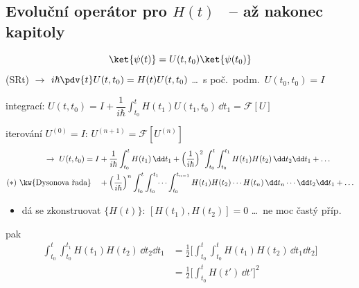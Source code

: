 \subsection{Evoluční operátor pro $H(t)$ \ {\normalfont\small -- až nakonec kapitoly}}
\[
  \ket{\psi(t)} = U(t,t_0)\ket{\psi(t_0)}
\]
(SRt) $\to$ \quad $i\hbar\pdv{t}U(t,t_0) = H(t)U(t,t_0)$ \quad \dots\ s poč.\ podm.\ $U(t_0,t_0) = I$

integrací: \quad $U(t,t_0) = I + \dfrac{1}{i\hbar}\displaystyle\int_{t_0}^{t}H(t_1)U(t_1,t_0)\,\dd t_1 = \mathcal{F}[U]$

\quad iterování \quad $U^{(0)} = I$: \quad $U^{(n+1)} = \mathcal{F}[U^{(n)}]$
\begin{align*}
  \to\ U(t,t_0) = I &+ \frac{1}{i\hbar}\int_{t_0}^{t}H(t_1)\,\dd t_1 + \Big(\frac{1}{i\hbar}\Big)^2\int_{t_0}^{t}\int_{t_0}^{t_1}H(t_1)H(t_2)\,\dd t_2\dd t_1 + \dots \\
  \text{($*$) \kw{Dysonova řada}} \quad &+ \Big(\frac{1}{i\hbar}\Big)^n\int_{t_0}^{t}\int_{t_0}^{t_1}\!\!\cdots\int_{t_0}^{t_{n-1}}H(t_1)H(t_2)\cdots H(t_n)\,\dd t_n\cdots\dd t_2\dd t_1 + \dots
\end{align*}

\begin{itemize}
  \item dá se zkonstruovat $\{H(t)\}$: \quad $[H(t_1),H(t_2)] = 0$ \quad \dots\ ne moc častý příp.
\end{itemize}
\begin{minipage}{0.7\textwidth}
pak
\begin{align*}
 \int_{t_0}^{t}\int_{t_0}^{t_1}H(t_1)H(t_2)\,\dd t_2\dd t_1
 &= \frac12\Big[\int_{t_0}^{t}\int_{t_0}^{t}H(t_1)H(t_2)\,\dd t_1\dd t_2\Big] \\
 &= \frac12\Big[\int_{t_0}^{t}H(t')\,\dd t'\Big]^2
\end{align*}
\end{minipage}\hfill
\begin{minipage}{0.25\textwidth}
\end{minipage}

